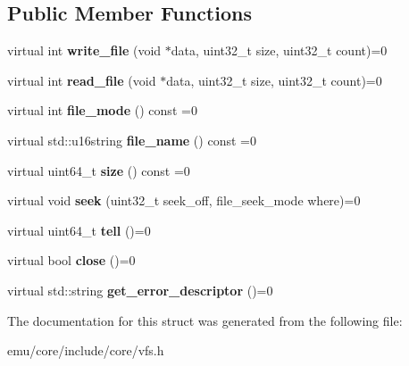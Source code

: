 \subsection*{Public Member Functions}
\begin{DoxyCompactItemize}
\item 
\mbox{\label{structeka2l1_1_1file_a55ac625ab57189b15164cae3e48974b5}} 
virtual int {\bfseries write\+\_\+file} (void $\ast$data, uint32\+\_\+t size, uint32\+\_\+t count)=0
\item 
\mbox{\label{structeka2l1_1_1file_a14f781fc7a657a0c056980578e0fd806}} 
virtual int {\bfseries read\+\_\+file} (void $\ast$data, uint32\+\_\+t size, uint32\+\_\+t count)=0
\item 
\mbox{\label{structeka2l1_1_1file_a212314c3447b222becfffba9ff3a7a30}} 
virtual int {\bfseries file\+\_\+mode} () const =0
\item 
\mbox{\label{structeka2l1_1_1file_afc2a9b09df0f596b1cf73d2a18e88d3d}} 
virtual std\+::u16string {\bfseries file\+\_\+name} () const =0
\item 
\mbox{\label{structeka2l1_1_1file_a10902c1492583f99d3cb4bc12b331ea5}} 
virtual uint64\+\_\+t {\bfseries size} () const =0
\item 
\mbox{\label{structeka2l1_1_1file_a2f1360916d069da9b7273da95ffc9aa2}} 
virtual void {\bfseries seek} (uint32\+\_\+t seek\+\_\+off, file\+\_\+seek\+\_\+mode where)=0
\item 
\mbox{\label{structeka2l1_1_1file_afb42b7820bc5b8152b7c24792d35c145}} 
virtual uint64\+\_\+t {\bfseries tell} ()=0
\item 
\mbox{\label{structeka2l1_1_1file_a8a619bb7b3f794c317d3e6d0830faf8d}} 
virtual bool {\bfseries close} ()=0
\item 
\mbox{\label{structeka2l1_1_1file_ae1f3c36f5cf8acdafc31eba5816460b7}} 
virtual std\+::string {\bfseries get\+\_\+error\+\_\+descriptor} ()=0
\end{DoxyCompactItemize}


The documentation for this struct was generated from the following file\+:\begin{DoxyCompactItemize}
\item 
emu/core/include/core/vfs.\+h\end{DoxyCompactItemize}
